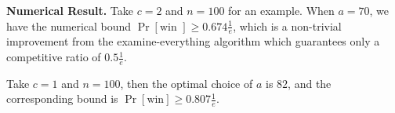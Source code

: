 \textbf{Numerical Result.}
Take $c=2 $ and $n = 100$ for an example. When $a = 70$, we have the numerical bound $\operatorname{Pr}\left[{\text{win }}\right]\ge 0.674 \frac{1}{e}$, which is a non-trivial improvement from the examine-everything algorithm which guarantees only a competitive ratio of $0.5 \frac{1}{e}$.

Take $c = 1$ and $n = 100$, then the optimal choice of $a$ is $82$, and the corresponding bound is $\operatorname{Pr} \left[\text{win}\right] \ge 0.807 \frac{1}{e}$.

\newpage









